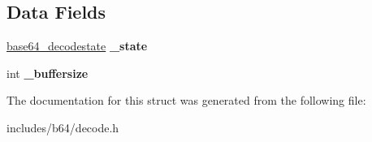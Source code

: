 \subsection*{Data Fields}
\begin{DoxyCompactItemize}
\item 
\hypertarget{structbase64_1_1decoder_acf9f75b5896098cd4cec6524f798be71}{\hyperlink{structbase64_1_1base64__decodestate}{base64\-\_\-decodestate} {\bfseries \-\_\-state}}\label{structbase64_1_1decoder_acf9f75b5896098cd4cec6524f798be71}

\item 
\hypertarget{structbase64_1_1decoder_ab9ef2d501bcca4a9f9e076df6044201c}{int {\bfseries \-\_\-buffersize}}\label{structbase64_1_1decoder_ab9ef2d501bcca4a9f9e076df6044201c}

\end{DoxyCompactItemize}


The documentation for this struct was generated from the following file\-:\begin{DoxyCompactItemize}
\item 
includes/b64/decode.\-h\end{DoxyCompactItemize}
